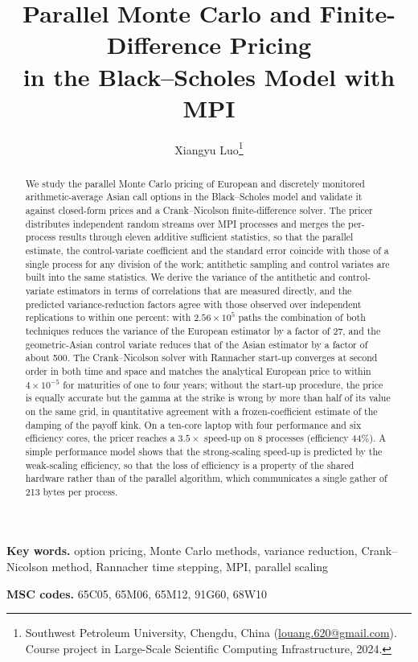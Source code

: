 \documentclass[11pt,a4paper]{article}
\title{Parallel Monte Carlo and Finite-Difference Pricing\\ in the Black--Scholes Model with MPI}
\author{Xiangyu Luo\thanks{Southwest Petroleum University, Chengdu, China (\href{mailto:louang.620@gmail.com}{louang.620@gmail.com}). Course project in Large-Scale Scientific Computing Infrastructure, 2024.}}
\date{}
\begin{document}
\maketitle

\begin{abstract}
We study the parallel Monte Carlo pricing of European and discretely monitored arithmetic-average Asian call options in the Black--Scholes model and validate it against closed-form prices and a Crank--Nicolson finite-difference solver.
The pricer distributes independent random streams over MPI processes and merges the per-process results through eleven additive sufficient statistics, so that the parallel estimate, the control-variate coefficient and the standard error coincide with those of a single process for any division of the work; antithetic sampling and control variates are built into the same statistics.
We derive the variance of the antithetic and control-variate estimators in terms of correlations that are measured directly, and the predicted variance-reduction factors agree with those observed over independent replications to within one percent: with $2.56\times10^5$ paths the combination of both techniques reduces the variance of the European estimator by a factor of 27, and the geometric-Asian control variate reduces that of the Asian estimator by a factor of about 500.
The Crank--Nicolson solver with Rannacher start-up converges at second order in both time and space and matches the analytical European price to within $4\times10^{-5}$ for maturities of one to four years; without the start-up procedure, the price is equally accurate but the gamma at the strike is wrong by more than half of its value on the same grid, in quantitative agreement with a frozen-coefficient estimate of the damping of the payoff kink.
On a ten-core laptop with four performance and six efficiency cores, the pricer reaches a $3.5\times$ speed-up on 8 processes (efficiency 44\%).
A simple performance model shows that the strong-scaling speed-up is predicted by the weak-scaling efficiency, so that the loss of efficiency is a property of the shared hardware rather than of the parallel algorithm, which communicates a single gather of 213 bytes per process.
\end{abstract}

\noindent\textbf{Key words.} option pricing, Monte Carlo methods, variance reduction, Crank--Nicolson method, Rannacher time stepping, MPI, parallel scaling

\smallskip
\noindent\textbf{MSC codes.} 65C05, 65M06, 65M12, 91G60, 68W10
\end{document}
